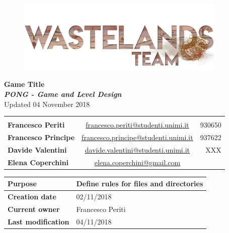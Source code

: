 \documentclass[12pt]{article}
\begin{document}
\begin{center}
  \begin{figure}[H]
    \centering
  \vspace*{5\baselineskip}
  \includegraphics[width=10cm]{Documents/Images/logoTeam}
  \end{figure}

  {\huge \textbf{Game Title}} \\
  {\large \textbf{ \textit{PONG - Game and Level Design}}} \\
  Updated 04 November 2018 \\

  \begin{tabular}{lcr}\\\\
    \textbf{Francesco Periti}	& \underline{\href{mailto:francesco.periti@studenti.unimi.it}{francesco.periti@studenti.unimi.it}}	& 930650 \\
    \textbf{Francesco Principe}	& \underline{\href{mailto:francesco.principe@studenti.unimi.it}{francesco.principe@studenti.unimi.it}}	& 937622 \\
    \textbf{Davide Valentini}	& \underline{\href{mailto:davide.valentini@studenti.unimi.it}{davide.valentini@studenti.unimi.it}}	& XXX \\
    \textbf{Elena Coperchini}	& \underline{\href{mailto:elena.coperchini@gmail.com}{elena.coperchini@gmail.com}}			& \\
  \end{tabular}


\begin{table}[H] 
  \begin{tabular}{|l|l|}
    \hline
    \cellcolor{gray}\textbf{Purpose} &  Define rules for files and directories \\\hline
    \cellcolor{gray}\textbf{Creation date} & 02/11/2018 \\\hline
    \cellcolor{gray}\textbf{Current owner} & Francesco Periti \\\hline
    \cellcolor{gray}\textbf{Last modification} & 04/11/2018 \\\hline
  \end{tabular}
\end{table}
\end{center}
\end{document}
